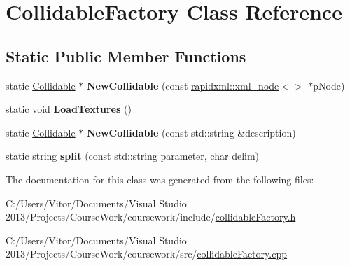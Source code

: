 \hypertarget{class_collidable_factory}{}\section{Collidable\+Factory Class Reference}
\label{class_collidable_factory}
\subsection*{Static Public Member Functions}
\begin{DoxyCompactItemize}
\item 
\hypertarget{class_collidable_factory_a303d4cd205bdb1f3aae93cd5dba7c2f1}{}static \hyperlink{class_collidable}{Collidable} $\ast$ {\bfseries New\+Collidable} (const \hyperlink{classrapidxml_1_1xml__node}{rapidxml\+::xml\+\_\+node}$<$$>$ $\ast$p\+Node)\label{class_collidable_factory_a303d4cd205bdb1f3aae93cd5dba7c2f1}

\item 
\hypertarget{class_collidable_factory_a404d4d7388ae35e9c321e51f3fbdf20e}{}static void {\bfseries Load\+Textures} ()\label{class_collidable_factory_a404d4d7388ae35e9c321e51f3fbdf20e}

\item 
\hypertarget{class_collidable_factory_aa6507a9b141c1d4a8820cf7fed50bdf4}{}static \hyperlink{class_collidable}{Collidable} $\ast$ {\bfseries New\+Collidable} (const std\+::string \&description)\label{class_collidable_factory_aa6507a9b141c1d4a8820cf7fed50bdf4}

\item 
\hypertarget{class_collidable_factory_af3f007e55b937202661281397f32c433}{}static string {\bfseries split} (const std\+::string parameter, char delim)\label{class_collidable_factory_af3f007e55b937202661281397f32c433}

\end{DoxyCompactItemize}


The documentation for this class was generated from the following files\+:\begin{DoxyCompactItemize}
\item 
C\+:/\+Users/\+Vitor/\+Documents/\+Visual Studio 2013/\+Projects/\+Course\+Work/coursework/include/\hyperlink{collidable_factory_8h}{collidable\+Factory.\+h}\item 
C\+:/\+Users/\+Vitor/\+Documents/\+Visual Studio 2013/\+Projects/\+Course\+Work/coursework/src/\hyperlink{collidable_factory_8cpp}{collidable\+Factory.\+cpp}\end{DoxyCompactItemize}
